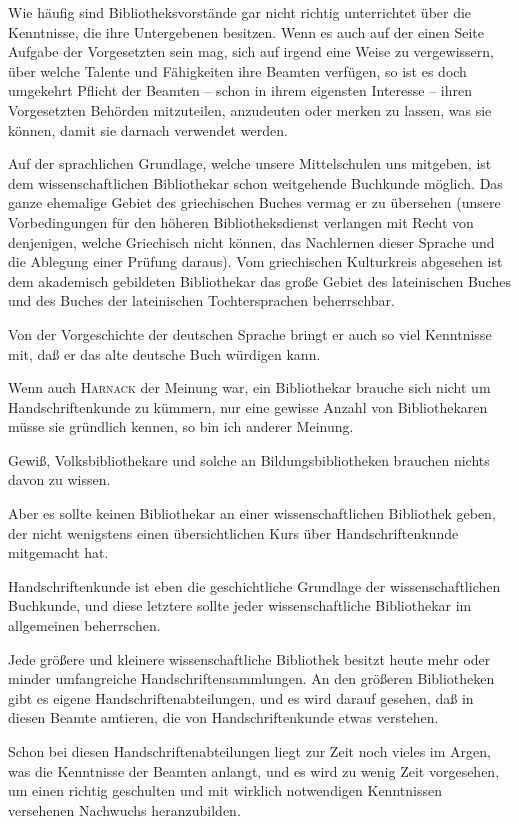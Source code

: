\documentclass[a4paper,
fontsize=11pt,
oneside,
numbers=noperiodatend,
parskip=half-,
bibliography=totoc,
final
]{scrartcl}
\begin{document}
Wie häufig sind Bibliotheksvorstände gar nicht richtig unterrichtet über
die Kenntnisse, die ihre Untergebenen besitzen. Wenn es auch auf der
einen Seite Aufgabe der Vorgesetzten sein mag, sich auf irgend eine
Weise zu vergewissern, über welche Talente und Fähigkeiten ihre Beamten
verfügen, so ist es doch umgekehrt Pflicht der Beamten -- schon in ihrem
eigensten Interesse -- ihren Vorgesetzten Behörden mitzuteilen,
anzudeuten oder merken zu lassen, was sie können, damit sie darnach
verwendet werden.

Auf der sprachlichen Grundlage, welche unsere Mittelschulen uns
mitgeben, ist dem wissenschaftlichen Bibliothekar schon weitgehende
Buchkunde möglich. Das ganze ehemalige Gebiet des griechischen Buches
vermag er zu übersehen (unsere Vorbedingungen für den höheren
Bibliotheksdienst verlangen mit Recht von denjenigen, welche Griechisch
nicht können, das Nachlernen dieser Sprache und die Ablegung einer
Prüfung daraus). Vom griechischen Kulturkreis abgesehen ist dem
akademisch gebildeten Bibliothekar das große Gebiet des lateinischen
Buches und des Buches der lateinischen Tochtersprachen beherrschbar.

Von der Vorgeschichte der deutschen Sprache bringt er auch so viel
Kenntnisse mit, daß er das alte deutsche Buch würdigen kann.

Wenn auch \textsc{Harnack} der Meinung war, ein Bibliothekar brauche
sich nicht um Handschriftenkunde zu kümmern, nur eine gewisse Anzahl von
Bibliothekaren müsse sie gründlich kennen, so bin ich anderer Meinung.

Gewiß, Volksbibliothekare und solche an Bildungsbibliotheken brauchen
nichts davon zu wissen.

Aber es sollte keinen Bibliothekar an einer wissenschaftlichen
Bibliothek geben, der nicht wenigstens einen übersichtlichen Kurs über
Handschriftenkunde mitgemacht hat.

Handschriftenkunde ist eben die geschichtliche Grundlage der
wissenschaftlichen Buchkunde, und diese letztere sollte jeder
wissenschaftliche Bibliothekar im allgemeinen beherrschen.

Jede größere und kleinere wissenschaftliche Bibliothek besitzt heute
mehr oder minder umfangreiche Handschriftensammlungen. An den größeren
Bibliotheken gibt es eigene Handschriftenabteilungen, und es wird darauf
gesehen, daß in diesen Beamte amtieren, die von Handschriftenkunde etwas
verstehen.

Schon bei diesen Handschriftenabteilungen liegt zur Zeit noch vieles im
Argen, was die Kenntnisse der Beamten anlangt, und es wird zu wenig Zeit
vorgesehen, um einen richtig geschulten und mit wirklich notwendigen
Kenntnissen versehenen Nachwuchs heranzubilden.
\end{document}
